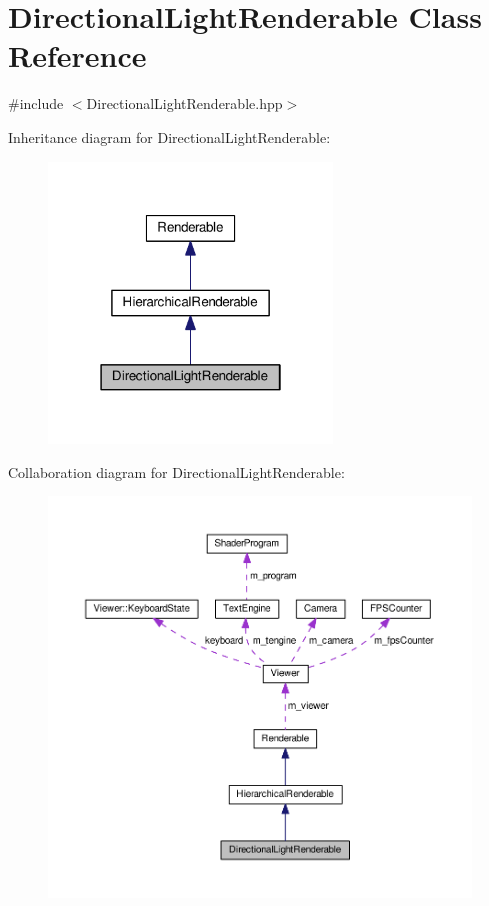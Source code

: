 \hypertarget{classDirectionalLightRenderable}{\section{Directional\+Light\+Renderable Class Reference}
\label{classDirectionalLightRenderable}
}


{\ttfamily \#include $<$Directional\+Light\+Renderable.\+hpp$>$}



Inheritance diagram for Directional\+Light\+Renderable\+:\nopagebreak
\begin{figure}[H]
\begin{center}
\leavevmode
\includegraphics[width=214pt]{classDirectionalLightRenderable__inherit__graph}
\end{center}
\end{figure}


Collaboration diagram for Directional\+Light\+Renderable\+:\nopagebreak
\begin{figure}[H]
\begin{center}
\leavevmode
\includegraphics[width=350pt]{classDirectionalLightRenderable__coll__graph}
\end{center}
\end{figure}

